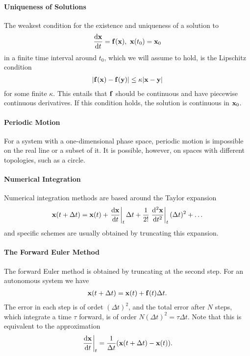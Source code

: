 \paragraph{Uniqueness of Solutions}
The weakest condition for the existence and uniqueness of a solution to
\begin{align*}
	\dv{\vb{x}}{t} = \vb{f}(\vb{x}),\ \vb{x}(t_{0}) = \vb{x}_{0}
\end{align*}
in a finite time interval around $t_{0}$, which we will assume to hold, is the Lipschitz condition
\begin{align*}
	\abs{\vb{f}(\vb{x}) - \vb{f}(\vb{y})} \leq \kappa\abs{\vb{x} - \vb{y}}
\end{align*}
for some finite $\kappa$. This entails that $\vb{f}$ should be continuous and have piecewise continuous derivatives. If this condition holds, the solution is continuous in $\vb{x}_{0}$.

\paragraph{Periodic Motion}
For a system with a one-dimensional phase space, periodic motion is impossible on the real line or a subset of it. It is possible, however, on spaces with different topologies, such as a circle.

\paragraph{Numerical Integration}
Numerical integration methods are based around the Taylor expansion
\begin{align*}
	\vb{x}(t + \Delta t) = \vb{x}(t) + \eval{\dv{\vb{x}}{t}}_{t}\Delta t + \frac{1}{2!}\eval{\dv[2]{\vb{x}}{t}}_{t}(\Delta t)^{2} + \dots
\end{align*}
and specific schemes are usually obtained by truncating this expansion.

\paragraph{The Forward Euler Method}
The forward Euler method is obtained by truncating at the second step. For an autonomous system we have
\begin{align*}
	\vb{x}(t + \Delta t) = \vb{x}(t) + \vb{f}(t)\Delta t.
\end{align*}
The error in each step is of ordet $(\Delta t)^{2}$, and the total error after $N$ steps, which integrate a time $\tau$ forward, is of order $N(\Delta t)^{2} = \tau\Delta t$. Note that this is equivalent to the approximation
\begin{align*}
	\eval{\dv{\vb{x}}{t}}_{t} = \frac{1}{\Delta t}(\vb{x}(t + \Delta t) - \vb{x}(t)).
\end{align*}

